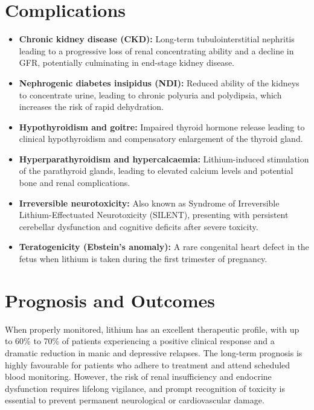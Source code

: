 \section*{Complications}
\begin{itemize}
    \item \textbf{Chronic kidney disease (CKD):} Long-term tubulointerstitial nephritis leading to a progressive loss of renal concentrating ability and a decline in GFR, potentially culminating in end-stage kidney disease.
    \item \textbf{Nephrogenic diabetes insipidus (NDI):} Reduced ability of the kidneys to concentrate urine, leading to chronic polyuria and polydipsia, which increases the risk of rapid dehydration.
    \item \textbf{Hypothyroidism and goitre:} Impaired thyroid hormone release leading to clinical hypothyroidism and compensatory enlargement of the thyroid gland.
    \item \textbf{Hyperparathyroidism and hypercalcaemia:} Lithium-induced stimulation of the parathyroid glands, leading to elevated calcium levels and potential bone and renal complications.
    \item \textbf{Irreversible neurotoxicity:} Also known as Syndrome of Irreversible Lithium-Effectuated Neurotoxicity (SILENT), presenting with persistent cerebellar dysfunction and cognitive deficits after severe toxicity.
    \item \textbf{Teratogenicity (Ebstein's anomaly):} A rare congenital heart defect in the fetus when lithium is taken during the first trimester of pregnancy.
\end{itemize}

\section*{Prognosis and Outcomes}
When properly monitored, lithium has an excellent therapeutic profile, with up to 60\% to 70\% of patients experiencing a positive clinical response and a dramatic reduction in manic and depressive relapses. The long-term prognosis is highly favourable for patients who adhere to treatment and attend scheduled blood monitoring. However, the risk of renal insufficiency and endocrine dysfunction requires lifelong vigilance, and prompt recognition of toxicity is essential to prevent permanent neurological or cardiovascular damage.

